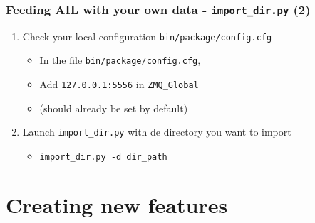 \documentclass{beamer}
\begin{document}
\begin{frame}
    \frametitle{Feeding AIL with your own data - \texttt{import\_dir.py} (2)}
    \begin{enumerate}
        \item Check your local configuration \texttt{\large{bin/package/config.cfg}}
            \begin{itemize}
                \item In the file \texttt{\large{bin/package/config.cfg}},
                \item Add \texttt{127.0.0.1:5556} in \texttt{ZMQ\_Global} 
                \item (should already be set by default)
            \end{itemize}
        \item Launch \texttt{import\_dir.py} with de directory you want to import
            \begin{itemize}
                \item \texttt{import\_dir.py -d dir\_path}
            \end{itemize}
    \end{enumerate}
\end{frame}

\section{Creating new features}
\end{document}
